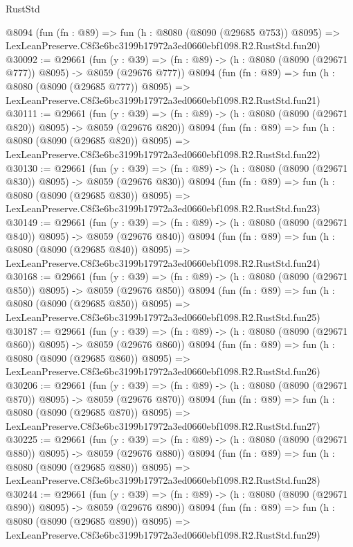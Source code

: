 \begin{lexlean}{RustStd}
\begin{coremodule}
    @8094
    (fun (fn : @89) =>
    fun (h : @8080 (@8090 (@29685 @753)) @8095) =>
    LexLeanPreserve.C8f3e6bc3199b17972a3ed0660ebf1098.R2.RustStd.fun20)
@30092 := @29661
    (fun (y : @39) => (fn : @89) -> (h : @8080 (@8090 (@29671 @777)) @8095) -> @8059 (@29676 @777))
    @8094
    (fun (fn : @89) =>
    fun (h : @8080 (@8090 (@29685 @777)) @8095) =>
    LexLeanPreserve.C8f3e6bc3199b17972a3ed0660ebf1098.R2.RustStd.fun21)
@30111 := @29661
    (fun (y : @39) => (fn : @89) -> (h : @8080 (@8090 (@29671 @820)) @8095) -> @8059 (@29676 @820))
    @8094
    (fun (fn : @89) =>
    fun (h : @8080 (@8090 (@29685 @820)) @8095) =>
    LexLeanPreserve.C8f3e6bc3199b17972a3ed0660ebf1098.R2.RustStd.fun22)
@30130 := @29661
    (fun (y : @39) => (fn : @89) -> (h : @8080 (@8090 (@29671 @830)) @8095) -> @8059 (@29676 @830))
    @8094
    (fun (fn : @89) =>
    fun (h : @8080 (@8090 (@29685 @830)) @8095) =>
    LexLeanPreserve.C8f3e6bc3199b17972a3ed0660ebf1098.R2.RustStd.fun23)
@30149 := @29661
    (fun (y : @39) => (fn : @89) -> (h : @8080 (@8090 (@29671 @840)) @8095) -> @8059 (@29676 @840))
    @8094
    (fun (fn : @89) =>
    fun (h : @8080 (@8090 (@29685 @840)) @8095) =>
    LexLeanPreserve.C8f3e6bc3199b17972a3ed0660ebf1098.R2.RustStd.fun24)
@30168 := @29661
    (fun (y : @39) => (fn : @89) -> (h : @8080 (@8090 (@29671 @850)) @8095) -> @8059 (@29676 @850))
    @8094
    (fun (fn : @89) =>
    fun (h : @8080 (@8090 (@29685 @850)) @8095) =>
    LexLeanPreserve.C8f3e6bc3199b17972a3ed0660ebf1098.R2.RustStd.fun25)
@30187 := @29661
    (fun (y : @39) => (fn : @89) -> (h : @8080 (@8090 (@29671 @860)) @8095) -> @8059 (@29676 @860))
    @8094
    (fun (fn : @89) =>
    fun (h : @8080 (@8090 (@29685 @860)) @8095) =>
    LexLeanPreserve.C8f3e6bc3199b17972a3ed0660ebf1098.R2.RustStd.fun26)
@30206 := @29661
    (fun (y : @39) => (fn : @89) -> (h : @8080 (@8090 (@29671 @870)) @8095) -> @8059 (@29676 @870))
    @8094
    (fun (fn : @89) =>
    fun (h : @8080 (@8090 (@29685 @870)) @8095) =>
    LexLeanPreserve.C8f3e6bc3199b17972a3ed0660ebf1098.R2.RustStd.fun27)
@30225 := @29661
    (fun (y : @39) => (fn : @89) -> (h : @8080 (@8090 (@29671 @880)) @8095) -> @8059 (@29676 @880))
    @8094
    (fun (fn : @89) =>
    fun (h : @8080 (@8090 (@29685 @880)) @8095) =>
    LexLeanPreserve.C8f3e6bc3199b17972a3ed0660ebf1098.R2.RustStd.fun28)
@30244 := @29661
    (fun (y : @39) => (fn : @89) -> (h : @8080 (@8090 (@29671 @890)) @8095) -> @8059 (@29676 @890))
    @8094
    (fun (fn : @89) =>
    fun (h : @8080 (@8090 (@29685 @890)) @8095) =>
    LexLeanPreserve.C8f3e6bc3199b17972a3ed0660ebf1098.R2.RustStd.fun29)

\end{coremodule}
\end{lexlean}
